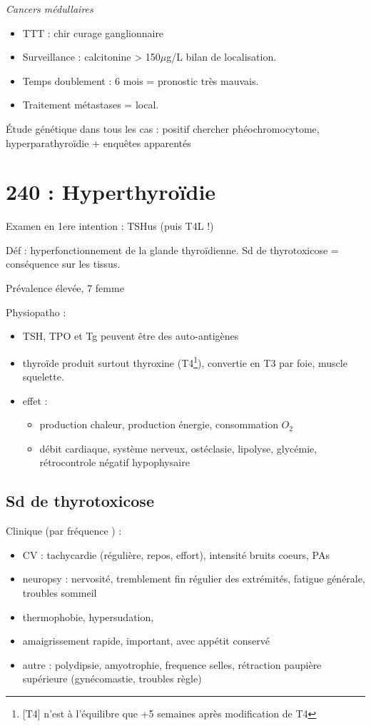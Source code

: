 \documentclass[11pt]{article}
\begin{document}
\emph{Cancers médullaires}
\begin{itemize}
\item TTT : chir \textpm{} curage ganglionnaire
\item Surveillance : calcitonine > 150\(\mu\)g/L \thus bilan de localisation.
\item Temps doublement : 6 mois = pronostic très mauvais.
\item Traitement métastases = local.
\end{itemize}

Étude génétique dans tous les cas : positif \thus chercher phéochromocytome,
hyperparathyroïdie + enquêtes apparentés
\section{240 : Hyperthyroïdie}
\label{sec:org14cf073}
\begin{tcolorbox}
Examen en 1ere intention : TSHus (puis T4L !)
\end{tcolorbox}

Déf : hyperfonctionnement de la glande thyroïdienne. Sd de thyrotoxicose =
conséquence sur les tissus.

Prévalence élevée, 7\texttimes{} femme

Physiopatho :
\begin{itemize}
\item TSH, \gls{TPO} et Tg peuvent être des auto-antigènes
\item thyroïde produit surtout thyroxine (T4\footnote{[T4] n'est à l'équilibre que +5 semaines après modification de T4}), convertie en T3 par foie, muscle
squelette.
\item effet : 
\begin{itemize}
\item \inc production chaleur, \inc production énergie, \inc consommation \(O_2\)
\item \inc débit cardiaque, système nerveux, \inc ostéclasie, \inc lipolyse, \inc
glycémie, rétrocontrole négatif hypophysaire
\end{itemize}
\end{itemize}

\subsection{Sd de thyrotoxicose}
\label{sec:orgbcb13cb}
Clinique (par fréquence \dec) :
\begin{itemize}
\item CV : tachycardie (régulière, repos, \inc effort), \inc intensité bruits
coeurs, \inc PAs
\item neuropsy : nervosité, tremblement fin régulier des extrémités, fatigue
générale, troubles sommeil
\item thermophobie, hypersudation,
\item amaigrissement rapide, important, avec appétit conservé
\item autre : polydipsie, amyotrophie, \inc frequence selles, rétraction paupière
supérieure (gynécomastie, troubles règle)
\end{itemize}
\end{document}
